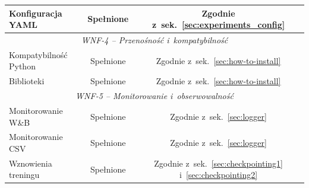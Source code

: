 \documentclass[a4paper,11pt,twoside]{report}
\theoremstyle{definition}
\begin{document}
\begin{table}[h!]
\begin{tabular}{@{}lcc@{}}
Konfiguracja YAML & Spełnione & Zgodnie z~sek.~\ref{sec:experiments_config} \\
\midrule
\multicolumn{3}{c}{\textit{WNF-4 -- Przenośność i~kompatybilność}} \\
\midrule
Kompatybilność Python & Spełnione & Zgodnie z~sek.~\ref{sec:how-to-install}\\
Biblioteki & Spełnione & Zgodnie z~sek.~\ref{sec:how-to-install}\\
\midrule
\multicolumn{3}{c}{\textit{WNF-5 -- Monitorowanie i~obserwowalność}} \\
\midrule
Monitorowanie W\&B & Spełnione & Zgodnie z~sek.~\ref{sec:logger}\\
Monitorowanie CSV & Spełnione & Zgodnie z~sek.~\ref{sec:logger}\\
Wznowienia treningu & Spełnione & Zgodnie z~sek.~\ref{sec:checkpointing1} i~\ref{sec:checkpointing2}\\
\bottomrule
\end{tabular}
\end{table}
\end{document}
